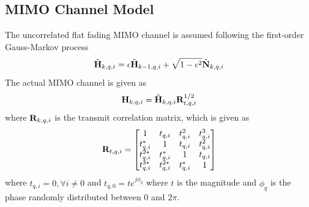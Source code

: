 \documentclass[10pt,conference]{IEEEtran}
\begin{document}
\subsection{MIMO Channel Model}
The uncorrelated flat fading MIMO channel is assumed following the first-order Gauss-Markov
process
\begin{equation}
    \tilde{{\bf{H}}}_{k,q,i} = \epsilon \tilde{{\bf{H}}}_{k-1,q,i} + \sqrt{1-\epsilon^2} \tilde{{\bf{N}}}_{k,q,i} \label{eq16}
\end{equation}
The actual MIMO channel is given as
\begin{equation}
    {\bf{H}}_{k,q,i} = \tilde{{\bf{H}}}_{k,q,i} {\bf{R}}_{t,q,i}^{1/2} \label{eq17}
\end{equation}
where ${\bf{R}}_{k,q,i}$ is the transmit correlation matrix, which is given as
\begin{equation}
    {\bf{R}}_{t,q,i} = \left[  \begin{matrix} 1 & t_{q,i} & t_{q,i}^2 & t_{q,i}^3\\
        t_{q,i}^* & 1 & t_{q,i} & t_{q,i}^2\\
        t_{q,i}^{2*} & t_{q,i}^* & 1 & t_{q,i}\\
        t_{q,i}^{3*} & t_{q,i}^{2*} & t_{q,i}^* & 1\end{matrix}\right] \label{eq18}
\end{equation}
where $t_{q,i}=0, \forall i \neq 0$ and $t_{q,0}=te^{j \phi_q}$ where $t$ is the magnitude
and $\phi_q$ is the phase randomly distributed between $0$ and $2\pi$.
\end{document}
